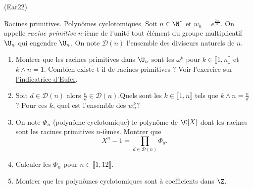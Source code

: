 \begin{tiny}(Ear22)\end{tiny} Racines primitives. Polynômes cyclotomiques.\newline
Soit $n\in \N^*$ et $w_n = e^{\frac{2i\pi}{n}}$. On appelle \emph{racine primitive} $n$-ième de l'unité tout élément du groupe multiplicatif $\U_n$ qui engendre $\U_n$. On note $\mathcal{D}(n)$ l'ensemble des diviseurs naturels de $n$. 
\begin{enumerate}
 \item Montrer que les racines primitives dans $\U_n$ sont les $\omega^k$ pour $k \in \llbracket 1,n \rrbracket$ et $k\wedge n = 1$. Combien existe-t-il de racines primitives ? Voir l'exercice sur \href{http://back.maquisdoc.net/data/exos_nicolair/_fex_az.pdf}{l'indicatrice d'Euler}.
 
 \item Soit $d \in \mathcal{D}(n)$ alors $\frac{n}{d}\in \mathcal{D}(n)$.\newline Quels sont les $k\in \llbracket 1,n \rrbracket$ tels que $k \wedge n = \frac{n}{d}$ ? Pour ces $k$, quel est l'ensemble des $w_n^k$?

 \item On note $\Phi_n$ (polynôme cyclotomique) le polynôme de $\C[X]$ dont les racines sont les racines primitives $n$-ièmes. Montrer que 
\[
 X^n - 1 = \prod_{d \in \mathcal{D}(n)} \Phi_d .
\]
 
 \item Calculer les $\Phi_n$ pour $n\in \llbracket 1,12\rrbracket$.
 
 \item Montrer que les polynômes cyclotomiques sont à coefficients dans $\Z$.
\end{enumerate}
